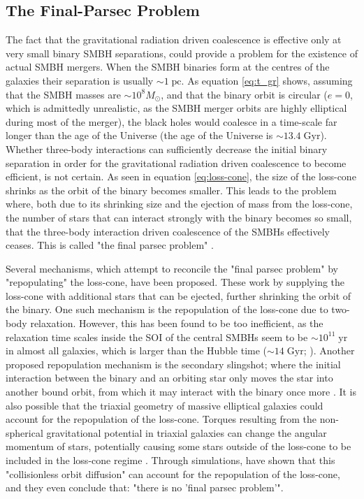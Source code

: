 \documentclass[english, twoside]{HYgradu}
\begin{document}
\subsection{The Final-Parsec Problem}

The fact that the gravitational radiation driven coalescence is effective only at very small binary SMBH separations, could provide a problem for the existence of actual SMBH mergers. When the SMBH binaries form at the centres of the galaxies their separation is usually $\sim 1 \; \mathrm{pc}$. As equation \ref{eq:t_gr} shows, assuming that the SMBH masses are $\sim 10^8 M_\odot$, and that the binary orbit is circular ($e = 0$, which is admittedly unrealistic, as the SMBH merger orbits are highly elliptical during most of the merger), the black holes would coalesce in a time-scale far longer than the age of the Universe (the age of the Universe is $\sim 13.4 \; \mathrm{Gyr}$). Whether three-body interactions can sufficiently decrease the initial binary separation in order for the gravitational radiation driven coalescence to become efficient, is not certain. As seen in equation \ref{eq:loss-cone}, the size of the loss-cone shrinks as the orbit of the binary becomes smaller. This leads to the problem where, both due to its shrinking size and the ejection of mass from the loss-cone, the number of stars that can interact strongly with the binary becomes so small, that the three-body interaction driven coalescence of the SMBHs effectively ceases. This is called "the final parsec problem" \citep{Milosavljevic2003}.

Several mechanisms, which attempt to reconcile the "final parsec problem" by "repopulating" the loss-cone, have been proposed. These work by supplying the loss-cone with additional stars that can be ejected, further shrinking the orbit of the binary. One such mechanism is the repopulation of the loss-cone due to two-body relaxation. However, this has been found to be too inefficient, as the relaxation time scales inside the SOI of the central SMBHs seem to be $\sim 10^{11} \; \mathrm{yr}$ in almost all galaxies, which is larger than the Hubble time ($\sim 14 \; \mathrm{Gyr}$; \citealt{Faber1997, Milosavljevic2001}). Another proposed repopulation mechanism is the secondary slingshot; where the initial interaction between the binary and an orbiting star only moves the star into another bound orbit, from which it may interact with the binary once more \citep{MerrittBook}. It is also possible that the triaxial geometry of massive elliptical galaxies could account for the repopulation of the loss-cone. Torques resulting from the non-spherical gravitational potential in triaxial galaxies can change the angular momentum of stars, potentially causing some stars outside of the loss-cone to be included in the loss-cone regime \citep{MerrittBook, Gualandris2017}. Through simulations, \cite{Gualandris2017} have shown that this "collisionless orbit diffusion" can account for the repopulation of the loss-cone, and they even conclude that: "there is no 'final parsec problem'".
\end{document}
